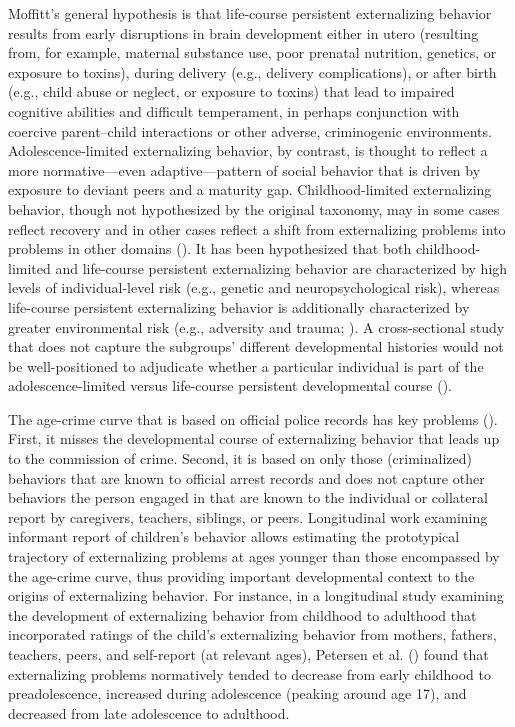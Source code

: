 \documentclass[
  american,
  letterpaper,
  12pt]{article}
\begin{document}
Moffitt's general hypothesis is that life-course persistent
externalizing behavior results from early disruptions in brain
development either in utero (resulting from, for example, maternal
substance use, poor prenatal nutrition, genetics, or exposure to
toxins), during delivery (e.g., delivery complications), or after birth
(e.g., child abuse or neglect, or exposure to toxins) that lead to
impaired cognitive abilities and difficult temperament, in perhaps
conjunction with coercive parent--child interactions or other adverse,
criminogenic environments. Adolescence-limited externalizing behavior,
by contrast, is thought to reflect a more normative---even
adaptive---pattern of social behavior that is driven by exposure to
deviant peers and a maturity gap. Childhood-limited externalizing
behavior, though not hypothesized by the original taxonomy, may in some
cases reflect recovery and in other cases reflect a shift from
externalizing problems into problems in other domains
(). It has been
hypothesized that both childhood-limited and life-course persistent
externalizing behavior are characterized by high levels of
individual-level risk (e.g., genetic and neuropsychological risk),
whereas life-course persistent externalizing behavior is additionally
characterized by greater environmental risk (e.g., adversity and trauma;
). A cross-sectional
study that does not capture the subgroups' different developmental
histories would not be well-positioned to adjudicate whether a
particular individual is part of the adolescence-limited versus
life-course persistent developmental course
().

The age-crime curve that is based on official police records has key
problems (). First, it misses
the developmental course of externalizing behavior that leads up to the
commission of crime. Second, it is based on only those (criminalized)
behaviors that are known to official arrest records and does not capture
other behaviors the person engaged in that are known to the individual
or collateral report by caregivers, teachers, siblings, or peers.
Longitudinal work examining informant report of children's behavior
allows estimating the prototypical trajectory of externalizing problems
at ages younger than those encompassed by the age-crime curve, thus
providing important developmental context to the origins of
externalizing behavior. For instance, in a longitudinal study examining
the development of externalizing behavior from childhood to adulthood
that incorporated ratings of the child's externalizing behavior from
mothers, fathers, teachers, peers, and self-report (at relevant ages),
Petersen et al. () found that
externalizing problems normatively tended to decrease from early
childhood to preadolescence, increased during adolescence (peaking
around age 17), and decreased from late adolescence to adulthood.
\end{document}
